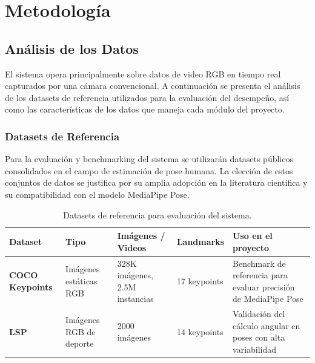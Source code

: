 \setcounter{chapter}{1}
\chapter{Metodología}

\section{Análisis de los Datos}

El sistema opera principalmente sobre datos de video RGB en tiempo real
capturados por una cámara convencional. A continuación se presenta el
análisis de los datasets de referencia utilizados para la evaluación del
desempeño, así como las características de los datos que maneja cada
módulo del proyecto.

\subsection{Datasets de Referencia}

Para la evaluación y benchmarking del sistema se utilizarán datasets
públicos consolidados en el campo de estimación de pose humana. La
elección de estos conjuntos de datos se justifica por su amplia adopción
en la literatura científica y su compatibilidad con el modelo MediaPipe
Pose. \cite{Bazarevskyetal2020, 10.1007/978-3-319-10602-1_48}

\begin{table}[h!]
\centering
\label{tab:datasets}
\renewcommand{\arraystretch}{1.3}
\begin{tabularx}{\textwidth}{
    >{\bfseries}p{3.5cm}
    X
    X
    X
    X
}
\toprule
\textbf{Dataset} &
\textbf{Tipo} &
\textbf{Imágenes / Videos} &
\textbf{Landmarks} &
\textbf{Uso en el proyecto} \\
\midrule
COCO Keypoints &
  Imágenes estáticas RGB &
  328K imágenes, 2.5M instancias &
  17 keypoints &
  Benchmark de referencia para evaluar precisión de MediaPipe Pose \\
\midrule
LSP &
  Imágenes RGB de deporte &
  2000 imágenes &
  14 keypoints &
  Validación del cálculo angular en poses con alta variabilidad \\
\bottomrule
\end{tabularx}
\caption{Datasets de referencia para evaluación del sistema.}
\end{table}

